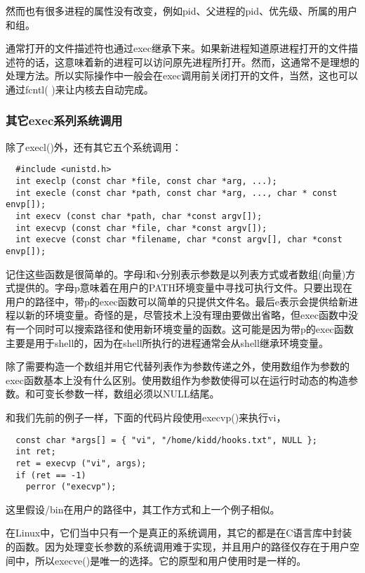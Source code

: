然而也有很多进程的属性没有改变，例如pid、父进程的pid、优先级、所属的用户和组。

通常打开的文件描述符也通过exec继承下来。如果新进程知道原进程打开的文件描述符的话，这意味着新的进程可以访问原先进程所打开。然而，这通常不是理想的处理方法。所以实际操作中一般会在exec调用前关闭打开的文件，当然，这也可以通过fcntl( )来让内核去自动完成。

\subsubsection{其它exec系列系统调用}

除了execl()外，还有其它五个系统调用：

\begin{lstlisting}
  #include <unistd.h>
  int execlp (const char *file, const char *arg, ...);
  int execle (const char *path, const char *arg, ..., char * const envp[]);
  int execv (const char *path, char *const argv[]);
  int execvp (const char *file, char *const argv[]);
  int execve (const char *filename, char *const argv[], char *const envp[]);
\end{lstlisting}

记住这些函数是很简单的。字母l和v分别表示参数是以列表方式或者数组(向量)方式提供的。字母p意味着在用户的PATH环境变量中寻找可执行文件。只要出现在用户的路径中，带p的exec函数可以简单的只提供文件名。最后e表示会提供给新进程以新的环境变量。奇怪的是，尽管技术上没有理由要做出省略，但exec函数中没有一个同时可以搜索路径和使用新环境变量的函数。这可能是因为带p的exec函数主要是用于shell的，因为在shell所执行的进程通常会从shell继承环境变量。

除了需要构造一个数组并用它代替列表作为参数传递之外，使用数组作为参数的exec函数基本上没有什么区别。使用数组作为参数使得可以在运行时动态的构造参数。和可变长参数一样，数组必须以NULL结尾。

和我们先前的例子一样，下面的代码片段使用execvp()来执行vi，

\begin{lstlisting}
  const char *args[] = { "vi", "/home/kidd/hooks.txt", NULL };
  int ret;
  ret = execvp ("vi", args);
  if (ret == -1)
    perror ("execvp");
\end{lstlisting}

这里假设/bin在用户的路径中，其工作方式和上一个例子相似。

在Linux中，它们当中只有一个是真正的系统调用，其它的都是在C语言库中封装的函数。因为处理变长参数的系统调用难于实现，并且用户的路径仅存在于用户空间中，所以execve()是唯一的选择。它的原型和用户使用时是一样的。

